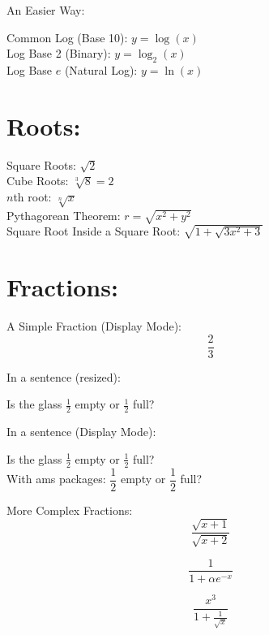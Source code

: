 \documentclass[11pt]{article} %
\begin{document}
\noindent
An Easier Way:

\begin{center}
Common Log (Base 10): $ y = \log (x) $\\[14pt] %
Log Base 2 (Binary): $y = \log_{2}(x) $\\[14pt]
Log Base $e$ (Natural Log): $ y = \ln (x) $
\end{center}

\section{Roots:}
\begin{center}
    Square Roots: $ \sqrt{2} $\\[14pt]
    Cube Roots: $ \sqrt[3]{8} = 2 $\\[14pt]
    $n$th root: $\sqrt[n]{x}$\\[14pt]
    Pythagorean Theorem: $ r = \sqrt{x^2 + y^2} $\\[14pt]
    Square Root Inside a Square Root: $ \sqrt{1 + \sqrt{3x^2 + 3}} $
\end{center}

\section{Fractions:}

\noindent
A Simple Fraction (Display Mode): $$ \frac{2}{3} $$

\noindent
In a sentence (resized):

\begin{center}
    Is the glass $\frac{1}{2}$ empty or $\frac{1}{2}$ full?
\end{center}

\noindent
In a sentence (Display Mode):
\begin{center}
    Is the glass $\displaystyle \frac{1}{2}$ empty or $\displaystyle \frac{1}{2}$ full?\\[14pt]
    With ams packages: $\dfrac{1}{2}$ empty or $\dfrac{1}{2}$ full?\\[14pt]
\end{center}

\pagebreak

\noindent
More Complex Fractions: 
$$ \frac{\sqrt{x+1}}{\sqrt{x+2}} $$

$$ \frac{1}{1 + \alpha e^{-x}} $$

$$ \frac{x^3}{1 + \frac{1}{\sqrt{x}}} $$
\end{document}
